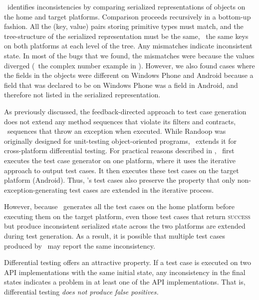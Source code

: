 \tool\ identifies inconsistencies by comparing serialized representations of
objects on the home and target platforms. Comparison proceeds recursively in a
bottom-up fashion. All the (\textsf{key}, \textsf{value}) pairs storing
primitive types must match, and the tree-structure of the serialized
representation must be the same, \ie~the same \textsf{key}s on both platforms
at each level of the tree. Any mismatches indicate inconsistent state. In most
of the bugs that we found, the mismatches were because the \textsf{value}s
diverged (\eg~the complex number example in ).
However, we also found cases where the fields in the objects were different on
Windows Phone and Android because a field that was declared to be 
on Windows Phone was a  field in Android, and therefore not
listed in the serialized representation. 

As previously discussed, the feedback-directed approach to test case generation
does not extend any method sequences that violate its filters and contracts,
\eg~sequences that throw an exception when executed. While Randoop was
originally designed for unit-testing object-oriented programs, \tool\ extends
it for cross-platform differential testing. For practical reasons described in
, \tool\ first executes the test case generator
on one platform, where it uses the iterative approach to output test cases.  It
then executes these test cases on the target platform (Android). Thus, \tool's
test cases also preserve the property that only non-exception-generating test
cases are extended in the iterative process. 

However, because \tool\ generates all the test cases on the home platform
before executing them on the target platform, even those test cases that return
\textsc{success} but produce inconsistent serialized state across the two
platforms are extended during test generation. As a result, it is possible that
multiple test cases produced by \tool\ may report the same inconsistency.

%
Differential testing offers an attractive property. If a test case is executed
on two API implementations with the same initial state, any inconsistency in
the final states indicates a problem in at least one of the API
implementations. That is, differential testing \textit{does not produce false
positives.}

